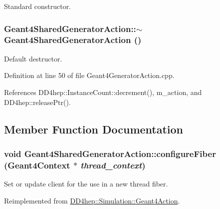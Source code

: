 Standard constructor. \hypertarget{class_d_d4hep_1_1_simulation_1_1_geant4_shared_generator_action_a56bf96138bef68d15352b9f6e2a5aa00}{
\subsubsection[{$\sim$Geant4SharedGeneratorAction}]{\setlength{\rightskip}{0pt plus 5cm}Geant4SharedGeneratorAction::$\sim$Geant4SharedGeneratorAction ()}}
\label{class_d_d4hep_1_1_simulation_1_1_geant4_shared_generator_action_a56bf96138bef68d15352b9f6e2a5aa00}


Default destructor. 

Definition at line 50 of file Geant4GeneratorAction.cpp.

References DD4hep::InstanceCount::decrement(), m\_\-action, and DD4hep::releasePtr().

\subsection{Member Function Documentation}
\hypertarget{class_d_d4hep_1_1_simulation_1_1_geant4_shared_generator_action_a9ca0ac287c96f37ceaa07740c43e7457}{
\subsubsection[{configureFiber}]{\setlength{\rightskip}{0pt plus 5cm}void Geant4SharedGeneratorAction::configureFiber ({\bf Geant4Context} $\ast$ {\em thread\_\-context})}}
\label{class_d_d4hep_1_1_simulation_1_1_geant4_shared_generator_action_a9ca0ac287c96f37ceaa07740c43e7457}


Set or update client for the use in a new thread fiber. 

Reimplemented from \hyperlink{class_d_d4hep_1_1_simulation_1_1_geant4_action_a6adc7138508303e4e417cb48a737ab19}{DD4hep::Simulation::Geant4Action}.

